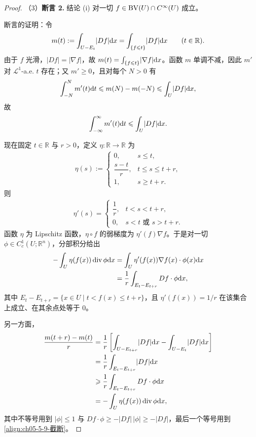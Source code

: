 \documentclass[../../main.tex]{subfiles}%
\begin{document}
\begin{proof}
（3）\textbf{断言 2.} 结论 (i) 对一切 $f\in\mathrm{BV}(U)\cap C^{\infty}(U)$ 成立。

断言的证明：令
\begin{align*}
m(t):=\int_{U-E_t}\lvert Df\rvert\mathrm{d} x=\int_{\{f\leqslant t\}}\lvert Df\rvert\mathrm{d} x\qquad(t\in\mathbb{R}).
\end{align*}
由于 $f$ 光滑，$\lvert Df\rvert=\lvert\nabla f\rvert$，故 $m(t)=\int_{\{f\leqslant t\}}\lvert\nabla f\rvert\mathrm{d} x$。函数 $m$ 单调不减，因此 $m'$ 对 $\mathcal{L}^1$-a.e. $t$ 存在；又 $m'\geqslant0$，且对每个 $N>0$ 有
\begin{align*}
\int_{-N}^{N}m'(t)\mathrm{d} t\leqslant m(N)-m(-N)\leqslant\int_U\lvert Df\rvert\mathrm{d} x,
\end{align*}
故
\begin{align}
\int_{-\infty}^{\infty}m'(t)\mathrm{d} t\leqslant\int_U\lvert Df\rvert\mathrm{d} x. \label{align:ch05-5-9-导数}
\end{align}

现在固定 $t\in\mathbb{R}$ 与 $r>0$，定义 $\eta:\mathbb{R}\to\mathbb{R}$ 为
\begin{align*}
\eta(s):=
\begin{cases}
0, & s\leqslant t,\\
\dfrac{s-t}{r}, & t\leqslant s\leqslant t+r,\\
1, & s\geqslant t+r.
\end{cases}
\end{align*}
则
\begin{align*}
\eta'(s)=
\begin{cases}
\dfrac{1}{r}, & t<s<t+r,\\
0, & s<t\text{ 或 }s>t+r.
\end{cases}
\end{align*}
函数 $\eta$ 为 Lipschitz 函数，$\eta\circ f$ 的弱梯度为 $\eta'(f)\nabla f$。于是对一切 $\phi\in C_c^1(U;\mathbb{R}^n)$，分部积分给出
\begin{align}
-\int_U\eta(f(x))\operatorname{div}\phi\mathrm{d} x
&=\int_U\eta'(f(x))\nabla f(x)\cdot\phi(x)\mathrm{d} x\notag\\
&=\frac{1}{r}\int_{E_t-E_{t+r}}Df\cdot\phi\mathrm{d} x, \label{align:ch05-5-9-截断}
\end{align}
其中 $E_t-E_{t+r}=\{x\in U\mid t<f(x)\leqslant t+r\}$，且 $\eta'(f(x))=1/r$ 在该集合上成立、在其余点处等于 $0$。

另一方面，
\begin{align*}
\frac{m(t+r)-m(t)}{r}
&=\frac{1}{r}\left[\int_{U-E_{t+r}}\lvert Df\rvert\mathrm{d} x-\int_{U-E_t}\lvert Df\rvert\mathrm{d} x\right]\\
&=\frac{1}{r}\int_{E_t-E_{t+r}}\lvert Df\rvert\mathrm{d} x\\
&\geqslant\frac{1}{r}\int_{E_t-E_{t+r}}Df\cdot\phi\mathrm{d} x\\
&=-\int_U\eta(f(x))\operatorname{div}\phi\mathrm{d} x,
\end{align*}
其中不等号用到 $\lvert\phi\rvert\leqslant1$ 与 $Df\cdot\phi\geqslant-\lvert Df\rvert\,\lvert\phi\rvert\geqslant-\lvert Df\rvert$，最后一个等号用到\eqref{align:ch05-5-9-截断}。%


\end{proof}
\end{document}

